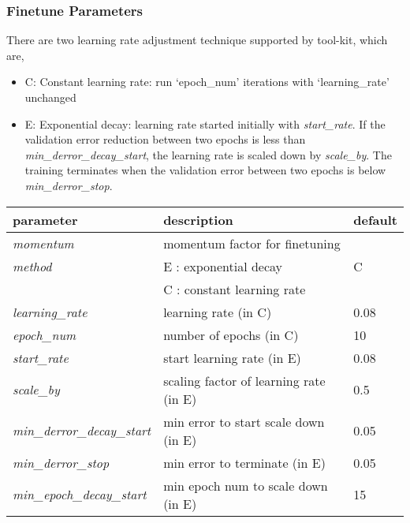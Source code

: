 \subsubsection{Finetune Parameters}
\label{subsec:finetuneparam}
There are two learning rate adjustment technique supported by tool-kit, which are,
\hspace{-2em}
\begin{itemize}
\item C: Constant learning rate: run `epoch\_num' iterations with `learning\_rate' unchanged
\item E: Exponential decay: learning rate started initially with \emph{start\_rate}.  If the validation error reduction between two epochs is less than \emph{min\_derror\_decay\_start}, the learning rate is scaled down by \emph{scale\_by}.  The training terminates when the validation error between two epochs is below \emph{min\_derror\_stop}.
\end{itemize}
\begin{table}[h]
\centering
\begin{tabular}{|l|l|l|}
\hline
\textbf{parameter}	& \textbf{description} 				& \textbf{default}\\  \hline
\emph{momentum} 			& momentum factor for finetuning 				& \\
\emph{method} 				& E : exponential decay 						& C\\
					& C : constant learning rate 						& \\
\emph{learning\_rate}   	& learning rate (in C) 							& 0.08\\
\emph{epoch\_num}          & number of epochs (in C) 			 		& 10\\
\emph{start\_rate}         & start learning rate (in E) 					& 0.08 \\
\emph{scale\_by}           & scaling factor of learning rate (in E)		& 0.5\\
\emph{min\_derror\_decay\_start}& min error to start scale down (in E) 	& 0.05\\
\emph{min\_derror\_stop}   & min error to terminate (in E) 	& 0.05 \\
\emph{min\_epoch\_decay\_start}  & min epoch num to scale down (in E)	& 15\\
\hline
\end{tabular}
\end{table} 
 
\clearpage
